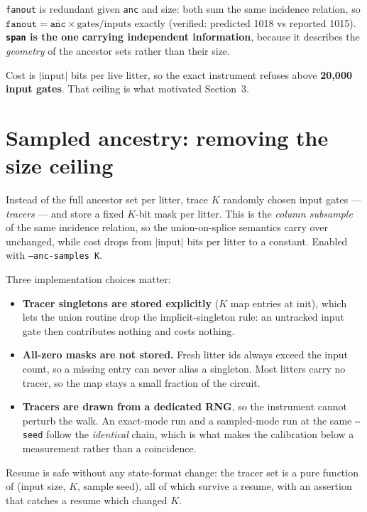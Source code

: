 \documentclass[11pt]{article}
\begin{document}
\texttt{fanout} is redundant given \texttt{anc} and size: both sum the same
incidence relation, so $\overline{\texttt{fanout}} = \overline{\texttt{anc}}
\times \text{gates}/\text{inputs}$ exactly (verified: predicted 1018 vs reported
1015). \textbf{\texttt{span} is the one carrying independent information},
because it describes the \emph{geometry} of the ancestor sets rather than their
size.

Cost is $|\text{input}|$ bits per live litter, so the exact instrument refuses
above \textbf{20{,}000 input gates}. That ceiling is what motivated Section~3.

\section{Sampled ancestry: removing the size ceiling}

Instead of the full ancestor set per litter, trace $K$ randomly chosen input
gates --- \emph{tracers} --- and store a fixed $K$-bit mask per litter. This is
the \emph{column subsample} of the same incidence relation, so the
union-on-splice semantics carry over unchanged, while cost drops from
$|\text{input}|$ bits per litter to a constant. Enabled with
\texttt{--anc-samples K}.

Three implementation choices matter:

\begin{itemize}
\item \textbf{Tracer singletons are stored explicitly} ($K$ map entries at
init), which lets the union routine drop the implicit-singleton rule: an
untracked input gate then contributes nothing and costs nothing.
\item \textbf{All-zero masks are not stored.} Fresh litter ids always exceed the
input count, so a missing entry can never alias a singleton. Most litters carry
no tracer, so the map stays a small fraction of the circuit.
\item \textbf{Tracers are drawn from a dedicated RNG}, so the instrument cannot
perturb the walk. An exact-mode run and a sampled-mode run at the same
\texttt{--seed} follow the \emph{identical} chain, which is what makes the
calibration below a measurement rather than a coincidence.
\end{itemize}

Resume is safe without any state-format change: the tracer set is a pure
function of (input size, $K$, sample seed), all of which survive a resume, with
an assertion that catches a resume which changed $K$.
\end{document}
